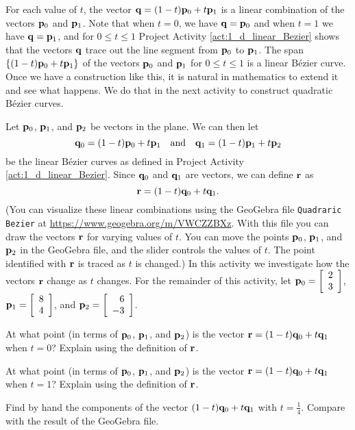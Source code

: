 For each value of $t$, the vector $\mathbf{q} = (1-t)\mathbf{p}_0 + t\mathbf{p}_1$ is a linear combination of the vectors $\mathbf{p}_0$ and $\mathbf{p}_1$. Note that when $t=0$, we have $\mathbf{q} = \mathbf{p}_0$ and when $t=1$ we have $\mathbf{q} = \mathbf{p}_1$, and for $0 \leq t \leq 1$ Project Activity \ref{act:1_d_linear_Bezier} shows that the vectors $\mathbf{q}$ trace out the line segment from $\mathbf{p}_0$ to $\mathbf{p}_1$. The span $\{(1-t)\mathbf{p}_0 + t\mathbf{p}_1\}$ of the vectors $\mathbf{p}_0$ and $\mathbf{p}_1$ for $0 \leq t \leq 1$ is a linear B\'{e}zier curve. Once we have a construction like this, it is natural in mathematics to extend it and see what happens. We do that in the next activity to construct quadratic B\'{e}zier curves.

\begin{pactivity} \label{act:1_d_quadratic_Bezier} Let $\mathbf{p}_0$, $\mathbf{p}_1$, and $\mathbf{p}_2$ be vectors in the plane. We can then let 
\[\mathbf{q}_0 = (1-t)\mathbf{p}_0 + t\mathbf{p}_1 \ \ \text{ and } \ \  \mathbf{q}_1 = (1-t)\mathbf{p}_1 + t\mathbf{p}_2\]
be the linear B\'{e}zier curves as defined in Project Activity \ref{act:1_d_linear_Bezier}. Since $\mathbf{q}_0$ and $\mathbf{q}_1$ are vectors, we can define $\mathbf{r}$ as  
\[\mathbf{r} = (1-t)\mathbf{q}_0 + t\mathbf{q}_1.\]
(You can visualize these linear combinations using the GeoGebra file \texttt{Quadraric Bezier} at \url{https://www.geogebra.org/m/VWCZZBXz}. With this file you can draw the vectors $\mathbf{r}$ for varying values of $t$. You can move the points $\mathbf{p}_0$, $\mathbf{p}_1$, and $\mathbf{p}_2$ in the GeoGebra file, and the slider controls the values of $t$. The point identified with $\mathbf{r}$ is traced as $t$ is changed.) In this activity we investigate how the vectors $\mathbf{r}$ change as $t$ changes. For the remainder of this activity, let $\mathbf{p}_0 = \left[ \begin{array}{c} 2 \\ 3 \end{array} \right]$, $\mathbf{p}_1 = \left[ \begin{array}{c} 8 \\ 4 \end{array} \right]$, and $\mathbf{p}_2 = \left[ \begin{array}{r} 6 \\ -3 \end{array} \right]$.	
	\ba
	\item At what point (in terms of $\mathbf{p}_0$, $\mathbf{p}_1$, and $\mathbf{p}_2$) is the vector $\mathbf{r} = (1-t)\mathbf{q}_0 + t\mathbf{q}_1$ when $t=0$? Explain using the definition of $\mathbf{r}$. 

\item At what point (in terms of $\mathbf{p}_0$, $\mathbf{p}_1$, and $\mathbf{p}_2$) is the vector $\mathbf{r} = (1-t)\mathbf{q}_0 + t\mathbf{q}_1$ when $t=1$? Explain using the definition of $\mathbf{r}$. 


\item Find by hand the components of the vector $(1-t)\mathbf{q}_0 + t\mathbf{q}_1$ with $t = \frac{1}{4}$. Compare with the result of the GeoGebra file. 


\ea

\end{pactivity}

